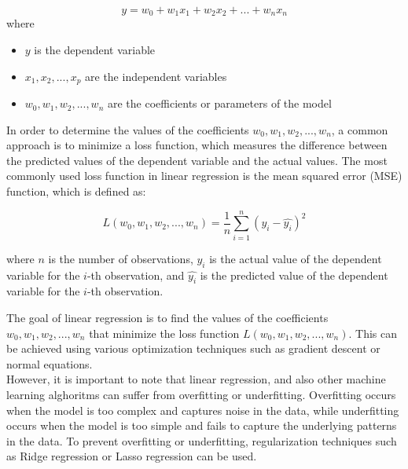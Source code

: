 \begin{equation}
	y = w_0 + w_1 x_1 + w_2 x_2 + ... + w_n x_n 
\end{equation}
 where 
\begin{itemize}
	\item $y$ is the dependent variable
	\item $x_1, x_2, ..., x_p$ are the independent variables
	\item $w_0, w_1, w_2, ..., w_n$ are the coefficients or parameters of the model
\end{itemize}

In order to determine the values of the coefficients $w_0, w_1, w_2, ..., w_n$, a common approach is to minimize a loss function, which measures the difference between the predicted values of the dependent variable and the actual values. The most commonly used loss function in linear regression is the mean squared error (MSE) function, which is defined as:

\begin{equation}
	L(w_0, w_1, w_2, ..., w_n) = \frac{1}{n} \sum_{i=1}^{n} (y_i - \hat{y_i})^2
\end{equation}

where $n$ is the number of observations, $y_i$ is the actual value of the dependent variable for the $i$-th observation, and $\hat{y_i}$ is the predicted value of the dependent variable for the $i$-th observation.

The goal of linear regression is to find the values of the coefficients $w_0, w_1, w_2, ..., w_n$ that minimize the loss function $L(w_0, w_1, w_2, ..., w_n)$. This can be achieved using various optimization techniques such as gradient descent or normal equations.\\

However, it is important to note that linear regression, and also other machine learning alghoritms can suffer from overfitting or underfitting. Overfitting occurs when the model is too complex and captures noise in the data, while underfitting occurs when the model is too simple and fails to capture the underlying patterns in the data. To prevent overfitting or underfitting, regularization techniques such as Ridge regression or Lasso regression can be used.


